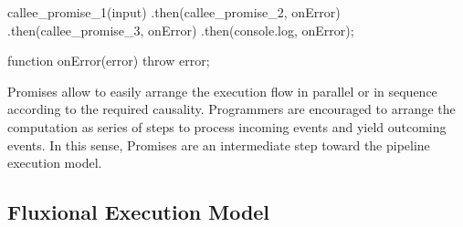 


\begin{code}[js, %
             caption={Example of a chain of Promises}, %
             label={lst:promises-sequence}] %
callee_promise_1(input)
.then(callee_promise_2, onError)
.then(callee_promise_3, onError)
.then(console.log, onError);

function onError(error) {
  throw error;
}
\end{code}

Promises allow to easily arrange the execution flow in parallel or in sequence according to the required causality.
Programmers are encouraged to arrange the computation as series of steps to process incoming events and yield outcoming events.
In this sense, Promises are an intermediate step toward the pipeline execution model.



\subsection{Fluxional Execution Model} \label{chapter4:flx-model}

